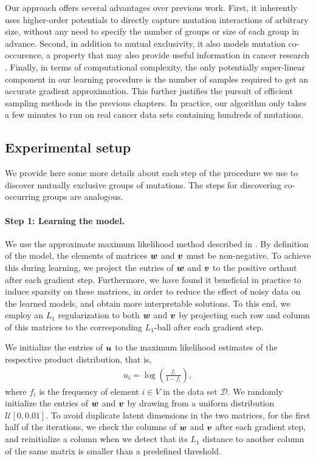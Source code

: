 Our approach offers several advantages over previous work.
First, it inherently uses higher-order potentials to directly capture mutation interactions of arbitrary size, without any need to specify the number of groups or size of each group in advance.
Second, in addition to mutual exclusivity, it also models mutation co-occurence, a property that may also provide useful information in cancer research \citep{yeang08,raphael14}.
Finally, in terms of computational complexity, the only potentially super-linear component in our learning procedure is the number of samples required to get an accurate gradient approximation.
This further justifies the pursuit of efficient sampling methods in the previous chapters.
In practice, our algorithm only takes a few minutes to run on real cancer data sets containing hundreds of mutations.


\subsection{Experimental setup}
We provide here some more details about each step of the procedure we use to discover mutually exclusive groups of mutations.
The steps for discovering co-occurring groups are analogous.

\paragraph{Step 1: Learning the \fldc{} model.}
We use the approximate maximum likelihood method described in .
By definition of the \fldc{} model, the elements of matrices $\bm{w}$ and $\bm{v}$ must be non-negative.
To achieve this during learning, we project the entries of $\bm{w}$ and $\bm{v}$ to the positive orthant after each gradient step.
Furthermore, we have found it beneficial in practice to induce sparsity on these matrices, in order to reduce the effect of noisy data on the learned models, and obtain more interpretable solutions.
To this end, we employ an $L_1$ regularization to both $\bm{w}$ and $\bm{v}$ by projecting each row and column of this matrices to the corresponding $L_1$-ball after each gradient step.

We initialize the entries of $\bm{u}$ to the maximum likelihood estimates of the respective product distribution, that is,
\begin{align*}
u_i = \log\left( \frac{f_i}{1 - f_i} \right),
\end{align*}
where $f_i$ is the frequency of element $i \in V$ in the data set $\mathcal{D}$.
We randomly initialize the entries of $\bm{w}$ and $\bm{v}$ by drawing from a uniform distribution $\mathcal{U}[0, 0.01]$.
To avoid duplicate latent dimensions in the two matrices, for the first half of the iterations, we check the columns of $\bm{w}$ and $\bm{v}$ after each gradient step, and reinitialize a column when we detect that its $L_1$ distance to another column of the same matrix is smaller than a predefined threshold.

